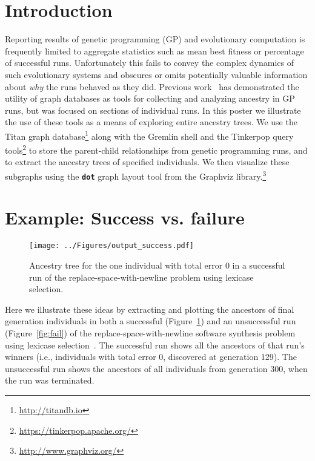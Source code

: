 \section{Introduction}
\label{sec:introduction}

Reporting results of genetic programming (GP) and evolutionary computation is frequently limited to aggregate statistics such as mean best fitness or percentage of successful runs. Unfortunately this fails to convey the complex dynamics of such evolutionary systems and obscures or omits potentially valuable information about \emph{why} the runs behaved as they did. Previous work~\cite{McPhee:2015:GPTP} has demonstrated the utility of graph databases as tools for collecting and analyzing ancestry in GP runs, but was focused on sections of individual runs.
In this poster we illustrate the use of these tools as a means of exploring entire ancestry trees. We use the Titan graph database\footnote{\url{http://titandb.io}} along with the Gremlin shell and the Tinkerpop query tools\footnote{\url{https://tinkerpop.apache.org/}} to store the parent-child relationships from genetic programming runs, and to extract the ancestry trees of specified individuals. We then visualize these subgraphs using the \textbf{\texttt{dot}} graph layout tool from the Graphviz  library.\footnote{\url{http://www.graphviz.org/}}

\section{Example: Success vs. failure}
\label{sec:examples}

\begin{figure}[t]
	\centering
	\texttt{[image: ../Figures/output\_success.pdf]}
	\caption{Ancestry tree for the one individual with total error 0 in a successful run of the replace-space-with-newline problem using lexicase selection.}
	\label{fig:success}
\end{figure}

Here we illustrate these ideas by extracting and plotting the ancestors of final generation individuals in both a successful (Figure~\ref{fig:success}) and an unsuccessful run (Figure~\ref{fig:fail}) of the replace-space-with-newline software synthesis problem~\cite{Helmuth:2015:GECCO,Helmuth:2015:dissertation} using lexicase selection~\cite{Helmuth:2014:ieeeTEC}. The successful run shows all the ancestors of that run's winners (i.e., individuals with total error 0, discovered at generation 129). The unsuccessful run shows the ancestors of all individuals from generation 300, when the run was terminated.

